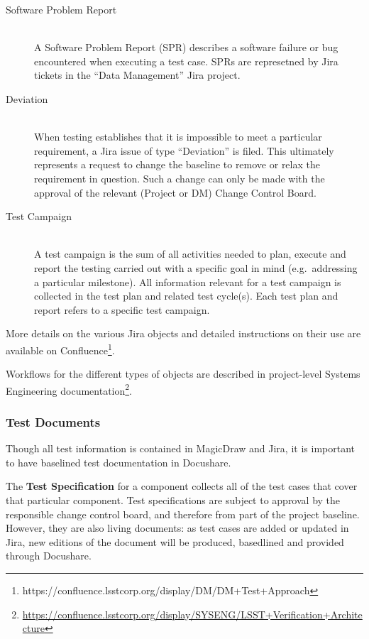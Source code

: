 \begin{description}
\item[Software Problem Report] \hfill \\
A Software Problem Report (SPR) describes a software failure or bug encountered when executing a test case.
SPRs are represetned by Jira tickets in the ``Data Management'' Jira project.

\item[Deviation] \hfill \\
When testing establishes that it is impossible to meet a particular requirement, a Jira issue of type ``Deviation'' is filed.
This ultimately represents a request to change the baseline to remove or relax the requirement in question.
Such a change can only be made with the approval of the relevant (Project or DM) Change Control Board.

\item[Test Campaign] \hfill \\
A test campaign is the sum of all activities needed to plan, execute and report the testing carried out with a specific goal in mind (e.g.\ addressing a particular milestone).
All information relevant for a test campaign is collected in the test plan and related test cycle(s).
Each test plan and report refers to a specific test campaign.

\end{description}

More details on the various Jira objects and detailed instructions on their use are available on Confluence\footnote{https://confluence.lsstcorp.org/display/DM/DM+Test+Approach}.

Workflows for the different types of objects are described in project-level Systems Engineering documentation\footnote{\url{https://confluence.lsstcorp.org/display/SYSENG/LSST+Verification+Architecture}}.

\subsubsection{Test Documents}
\label{sect:testdocs}

Though all test information is contained in MagicDraw and Jira, it is important to have baselined test documentation in Docushare.

The \textbf{Test Specification} for a component collects all of the test cases that cover that particular component.
Test specifications are subject to approval by the responsible change control board, and therefore from part of the project baseline.
However, they are also living documents: as test cases are added or updated in Jira, new editions of the document will be produced, basedlined and provided through Docushare.

